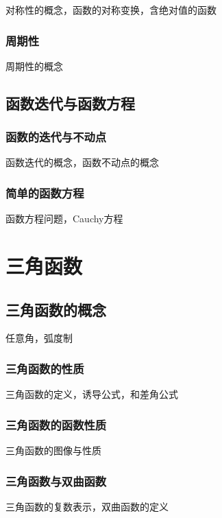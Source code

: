 \documentclass[lang=cn, zihao=4.5]{elegantbook}
\begin{document}
对称性的概念，函数的对称变换，含绝对值的函数

\subsection{周期性}

周期性的概念

\section{函数迭代与函数方程}

\subsection{函数的迭代与不动点}

函数迭代的概念，函数不动点的概念

\subsection{简单的函数方程}

函数方程问题，Cauchy方程

\chapter{三角函数}

\section{三角函数的概念}

任意角，弧度制

\subsection{三角函数的性质}

三角函数的定义，诱导公式，和差角公式

\subsection{三角函数的函数性质}

三角函数的图像与性质

\subsection{三角函数与双曲函数}

三角函数的复数表示，双曲函数的定义
\end{document}
